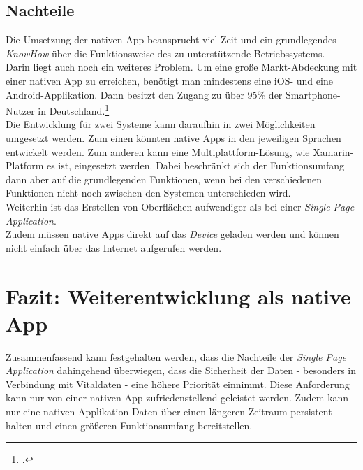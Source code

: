 \subsection{Nachteile}
\label{sec:nachteile-native-app}
Die Umsetzung der nativen App beansprucht viel Zeit und ein grundlegendes \textit{KnowHow} über die Funktionsweise des zu unterstützende Betriebssystems.\\
Darin liegt auch noch ein weiteres Problem. Um eine große Markt-Abdeckung mit einer nativen App zu erreichen, benötigt man mindestens eine iOS- und eine Android-Applikation. Dann besitzt den Zugang zu über 95\% der Smartphone-Nutzer in Deutschland.\footcite{Statista-SmartphoneVerteilung}\\
Die Entwicklung für zwei Systeme kann daraufhin in zwei Möglichkeiten umgesetzt werden. Zum einen könnten native Apps in den jeweiligen Sprachen entwickelt werden. Zum anderen kann eine Multiplattform-Lösung, wie Xamarin-Platform es ist, eingesetzt werden. Dabei beschränkt sich der Funktionsumfang dann aber auf die grundlegenden Funktionen, wenn bei den verschiedenen Funktionen nicht noch zwischen den Systemen unterschieden wird.\\
Weiterhin ist das Erstellen von Oberflächen aufwendiger als bei einer \textit{Single Page Application}.\\
Zudem müssen native Apps direkt auf das \textit{Device} geladen werden und können nicht einfach über das Internet aufgerufen werden.

\section{Fazit: Weiterentwicklung als native App}
\label{sec:gegenueberstellung-fazit}
Zusammenfassend kann festgehalten werden, dass die Nachteile der \textit{Single Page Application} dahingehend überwiegen, dass die Sicherheit der Daten - besonders in Verbindung mit Vitaldaten - eine höhere Priorität einnimmt. Diese Anforderung kann nur von einer nativen App zufriedenstellend geleistet werden. Zudem kann nur eine nativen Applikation Daten über einen längeren Zeitraum persistent halten und einen größeren Funktionsumfang bereitstellen.